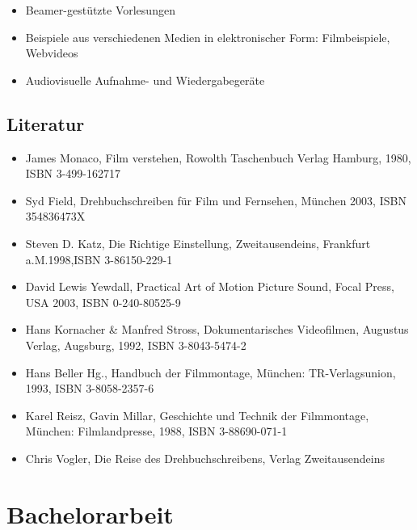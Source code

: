 \begin{itemize}
\tightlist
\item
  Beamer-gestützte Vorlesungen
\item
  Beispiele aus verschiedenen Medien in elektronischer Form:
  Filmbeispiele, Webvideos
\item
  Audiovisuelle Aufnahme- und Wiedergabegeräte
\end{itemize}

\section*{Literatur\label{/mi-2017/modulbeschreibungen-bachelor/BA_AVM}}\label{literaturpathlabelmi-2017modulbeschreibungen-bachelorbaux5favm}

\begin{itemize}
\tightlist
\item
  James Monaco, Film verstehen, Rowolth Taschenbuch Verlag Hamburg,
  1980, ISBN 3-499-162717
\item
  Syd Field, Drehbuchschreiben für Film und Fernsehen, München 2003,
  ISBN 354836473X
\item
  Steven D. Katz, Die Richtige Einstellung, Zweitausendeins, Frankfurt
  a.M.1998,ISBN 3-86150-229-1
\item
  David Lewis Yewdall, Practical Art of Motion Picture Sound, Focal
  Press, USA 2003, ISBN 0-240-80525-9
\item
  Hans Kornacher \& Manfred Stross, Dokumentarisches Videofilmen,
  Augustus Verlag, Augsburg, 1992, ISBN 3-8043-5474-2
\item
  Hans Beller Hg., Handbuch der Filmmontage, München: TR-Verlagsunion,
  1993, ISBN 3-8058-2357-6
\item
  Karel Reisz, Gavin Millar, Geschichte und Technik der Filmmontage,
  München: Filmlandpresse, 1988, ISBN 3-88690-071-1
\item
  Chris Vogler, Die Reise des Drehbuchschreibens, Verlag Zweitausendeins
\end{itemize}

\chapter{Bachelorarbeit\label{/mi-2017/modulbeschreibungen-bachelor/BA_Bachelorarbeit}}\label{bachelorarbeitpathlabelmi-2017modulbeschreibungen-bachelorbaux5fbachelorarbeit}

